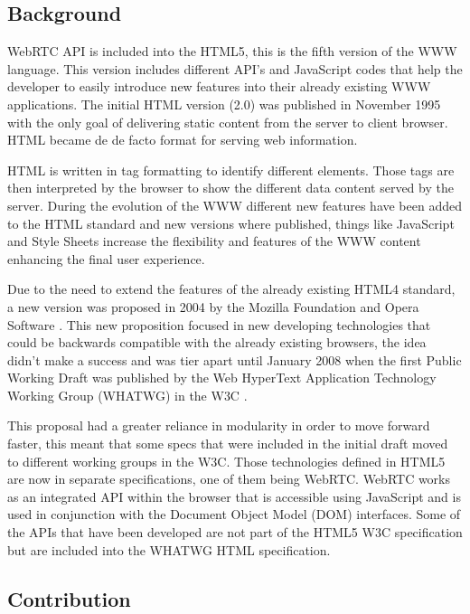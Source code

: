 \subsection{Background}

WebRTC API is included into the HTML5, this is the fifth version of the WWW language. This version includes different API's and JavaScript codes that help the developer to easily introduce new features into their already existing WWW applications. The initial HTML version (2.0) was published in November 1995 \cite{html2IETF} with the only goal of delivering static content from the server to client browser. HTML became de de facto format for serving web information. 

HTML is written in tag formatting to identify different elements. Those tags are then interpreted by the browser to show the different data content served by the server. During the evolution of the WWW different new features have been added to the HTML standard and new versions where published, things like JavaScript and Style Sheets increase the flexibility and features of the WWW content enhancing the final user experience.

Due to the need to extend the features of the already existing HTML4 standard, a new version was proposed in 2004 by the Mozilla Foundation and Opera Software \cite{initialHTML5proposition}. This new proposition focused in new developing technologies that could be backwards compatible with the already existing browsers, the idea didn't make a success and was tier apart until January 2008 when the first Public Working Draft was published by the Web HyperText Application Technology Working Group (WHATWG) in the W3C \cite{firstHTML5draft}.

This proposal had a greater reliance in modularity in order to move forward faster, this meant that some specs that were included in the initial draft moved to different working groups in the W3C. Those technologies defined in HTML5 are now in separate specifications, one of them being WebRTC. WebRTC works as an integrated API within the browser that is accessible using JavaScript and is used in conjunction with the Document Object Model (DOM) interfaces. Some of the APIs that have been developed are not part of the HTML5 W3C specification but are included into the WHATWG HTML specification.

\subsection{Contribution}

